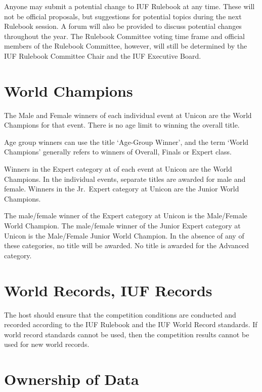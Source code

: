 Anyone may submit a potential change to IUF Rulebook at any time.
These will not be official proposals, but suggestions for potential topics during the next Rulebook session.
A forum will also be provided to discuss potential changes throughout the year.
The Rulebook Committee voting time frame and official members of the Rulebook Committee, however, will still be determined by the IUF Rulebook Committee Chair and the IUF Executive Board.

\section{World Champions}

The Male and Female winners of each individual event at Unicon are the World Champions for that event.
There is no age limit to winning the overall title.

Age group winners can use the title `Age-Group Winner', and the term `World Champions' generally refers to winners of Overall, Finals or Expert class.

Winners in the Expert category at of each event at Unicon are the World Champions.
In the individual events, separate titles are awarded for male and female.
Winners in the Jr.~Expert category at Unicon are the Junior World Champions.

The male/female winner of the Expert category at Unicon is the Male/Female World Champion.
The male/female winner of the Junior Expert category at Unicon is the Male/Female Junior World Champion.
In the absence of any of these categories, no title will be awarded.
No title is awarded for the Advanced category.

\section{World Records, IUF Records}

The host should ensure that the competition conditions are conducted and recorded according to the IUF Rulebook and the IUF World Record standards.
If world record standards cannot be used, then the competition results cannot be used for new world records.

\section{Ownership of Data}

